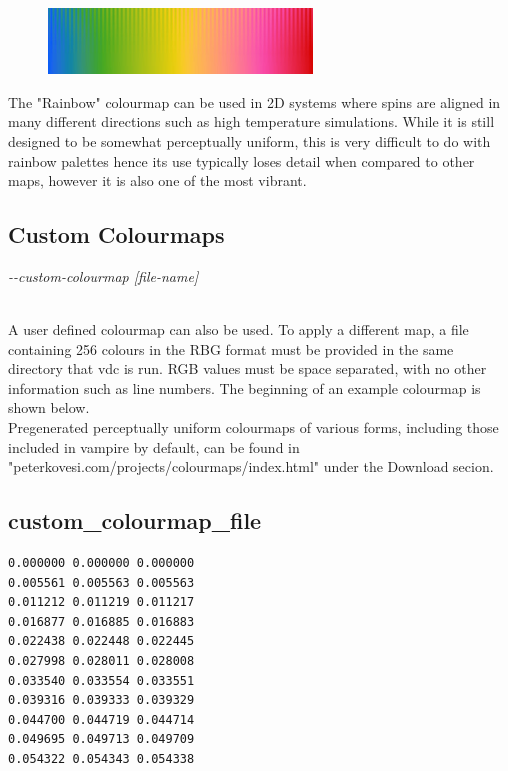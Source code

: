 \begin{figure}[!h]
\center
\includegraphics[width=7cm]{figures/Rainbow_colourmap.jpg}
\label{fig:Rainbow_colourmap}
\end{figure}

The "Rainbow" colourmap can be used in 2D systems where spins are aligned in many different directions such as high temperature simulations. While it is still designed to be somewhat perceptually uniform, this is very difficult to do with rainbow palettes hence its use typically loses detail when compared to other maps, however it is also one of the most vibrant. \\

\subsection*{Custom Colourmaps}

\begin{minipage}[c]{\textwidth}
\centering
\textit{-{}-custom-colourmap [file-name]}
\end{minipage}\\

A user defined colourmap can also be used. To apply a different map, a file containing 256 colours in the RBG format must be provided in the same directory that vdc is run. RGB values must be space separated, with no other information such as line numbers. The beginning of an example colourmap is shown below. \\

Pregenerated perceptually uniform colourmaps of various forms, including those included in vampire by default, can be found in "peterkovesi.com/projects/colourmaps/index.html" under the Download secion. \\

\subsection*{custom\_colourmap\_file}
{\footnotesize
\begin{verbatim}
0.000000 0.000000 0.000000
0.005561 0.005563 0.005563
0.011212 0.011219 0.011217
0.016877 0.016885 0.016883
0.022438 0.022448 0.022445
0.027998 0.028011 0.028008
0.033540 0.033554 0.033551
0.039316 0.039333 0.039329
0.044700 0.044719 0.044714
0.049695 0.049713 0.049709
0.054322 0.054343 0.054338
\end{verbatim}
}

